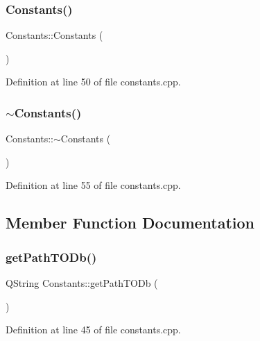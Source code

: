 \subsubsection{\texorpdfstring{Constants()}{Constants()}}
{\footnotesize\ttfamily Constants\+::\+Constants (\begin{DoxyParamCaption}{ }\end{DoxyParamCaption})}



Definition at line 50 of file constants.\+cpp.

\hypertarget{classConstants_a2dce6c6db3f1ba4114550606fae1765a}{}\label{classConstants_a2dce6c6db3f1ba4114550606fae1765a} 
\subsubsection{\texorpdfstring{$\sim$\+Constants()}{~Constants()}}
{\footnotesize\ttfamily Constants\+::$\sim$\+Constants (\begin{DoxyParamCaption}{ }\end{DoxyParamCaption})}



Definition at line 55 of file constants.\+cpp.



\subsection{Member Function Documentation}
\hypertarget{classConstants_ac74d671466a62e47fa4e431dbc569ba1}{}\label{classConstants_ac74d671466a62e47fa4e431dbc569ba1} 
\subsubsection{\texorpdfstring{get\+Path\+T\+O\+Db()}{getPathTODb()}}
{\footnotesize\ttfamily Q\+String Constants\+::get\+Path\+T\+O\+Db (\begin{DoxyParamCaption}{ }\end{DoxyParamCaption})\hspace{0.3cm}{\ttfamily [static]}}



Definition at line 45 of file constants.\+cpp.

